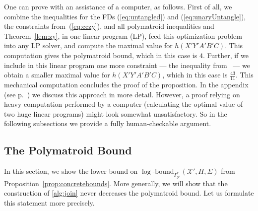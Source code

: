 \documentclass[a4paper,cleveref]{lipics-v2021}
\newcommand{\logb}{\mathrm{\log\text{-}bound}}
\newcommand{\vset}[1]{\mathcal{#1}}
\begin{document}
%


One  can prove  with an assistance of a computer, as follows.
First of all, we combine the inequalities for the FDs (\ref{eq:untangled})  and (\ref{eq:unaryUntangle}), the constraints from~(\ref{eq:cczy}), and all polymatroid inequalities and Theorem~\ref{lem:zy},
 in one linear program (LP),  feed this optimization problem into any LP solver,
 and compute the maximal value for $h(X'Y'A'B'C)$. 
This computation gives the polymatroid bound, which in this case is $4$. 
Further,  if  we  include in this linear program  one more constraint --- the inequality from~ --- 
we obtain a smaller maximal value for $h(X'Y'A'B'C)$, which in this case is $\frac{43}{11}$.
This mechanical computation concludes the proof of the proposition.
In the appendix (see p.~\pageref{sct:appendix}) we discuss this approach in more detail.
However, a proof relying on heavy computation performed by a computer (calculating the optimal value of two huge linear programs)  
might look somewhat unsatisfactory.  So in the following subsections we provide a fully human-checkable argument.


%
%
%
%
%


\subsection{The Polymatroid Bound}\label{sct:polymatroid-bound}

In this section, we show the lower  bound on $\logb_{\Gamma^*_{\vset Y'}}( {\vset X'}, \Pi, \Sigma)$ from Proposition~\ref{prop:concretebounds}.  
More generally, we will show that the construction of \cref{alg:join} never decreases the polymatroid bound.
Let us formulate this statement more precisely.
\end{document}
